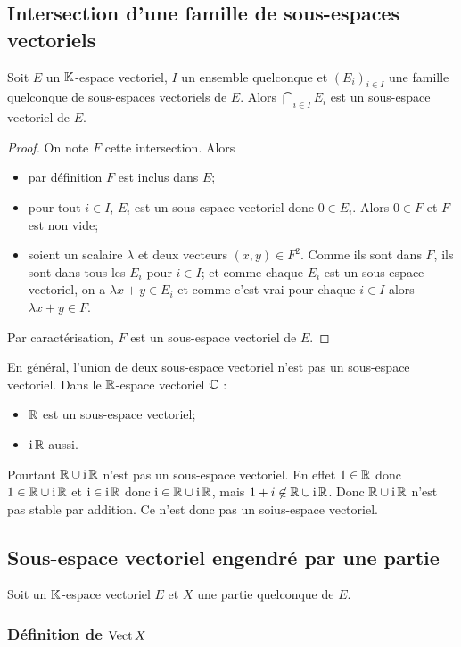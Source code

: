 \subsection{Intersection d'une famille de sous-espaces vectoriels}

\begin{theo}
  Soit $E$ un $\mathbb{K}$-espace vectoriel, $I$ un ensemble quelconque et $(E_i)_{i \in I}$ une famille quelconque de sous-espaces vectoriels de $E$. Alors $\bigcap_{i \in I} E_i$ est un sous-espace vectoriel de $E$.
\end{theo}
\begin{proof}
  On note $F$ cette intersection. Alors
  \begin{itemize}
  \item par définition $F$ est inclus dans $E$;
  \item pour tout $i \in I$, $E_i$ est un sous-espace vectoriel donc $0 \in E_i$. Alors $0 \in F$ et $F$ est non vide;
  \item soient un scalaire $\lambda$ et deux vecteurs $(x,y) \in F^2$. Comme ils sont dans $F$, ils sont dans tous les $E_i$ pour $i \in I$; et comme chaque $E_i$ est un sous-espace vectoriel, on a $\lambda x +y \in E_i$ et comme c'est vrai pour chaque $i \in I$ alors $\lambda x +y \in F$.
  \end{itemize}
  Par caractérisation, $F$ est un sous-espace vectoriel de $E$.
\end{proof}
%
En général, l'union de deux sous-espace vectoriel n'est pas un sous-espace vectoriel. Dans le $\mathbb{R}$-espace vectoriel $\mathbb{C}$ :
\begin{itemize}
\item $\mathbb{R}$ est un sous-espace vectoriel;
\item $\operatorname{i}\mathbb{R}$ aussi.
\end{itemize}
Pourtant $\mathbb{R} \cup \operatorname{i}\mathbb{R}$ n'est pas un sous-espace vectoriel. En effet $1 \in \mathbb{R}$ donc $1 \in \mathbb{R} \cup \operatorname{i}\mathbb{R}$ et $\operatorname{i} \in \operatorname{i}\mathbb{R}$ donc $\operatorname{i} \in \mathbb{R}\cup \operatorname{i}\mathbb{R}$, mais $1+i \not\in \mathbb{R}\cup\operatorname{i}\mathbb{R}$. Donc $\mathbb{R}\cup\operatorname{i}\mathbb{R}$ n'est pas stable par addition. Ce n'est donc pas un soius-espace vectoriel.

\subsection{Sous-espace vectoriel engendré par une partie}

Soit un $\mathbb{K}$-espace vectoriel $E$ et $X$ une partie quelconque de $E$.

\subsubsection{Définition de $\operatorname{Vect}{X}$}

